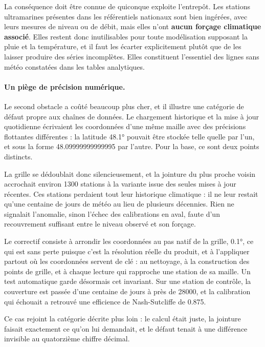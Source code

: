 La conséquence doit être connue de quiconque exploite l'entrepôt. Les stations ultramarines
présentes dans les référentiels nationaux sont bien ingérées, avec leurs mesures de niveau ou de
débit, mais elles n'ont \textbf{aucun forçage climatique associé}. Elles restent donc
inutilisables pour toute modélisation supposant la pluie et la température, et il faut les
écarter explicitement plutôt que de les laisser produire des séries incomplètes. Elles
constituent l'essentiel des lignes sans météo constatées dans les tables analytiques.

\paragraph{Un piège de précision numérique.} Le second obstacle a coûté beaucoup plus cher, et il
illustre une catégorie de défaut propre aux chaînes de données. Le chargement historique et la
mise à jour quotidienne écrivaient les coordonnées d'une même maille avec des précisions
flottantes différentes : la latitude \ang{48.1} pouvait être stockée telle quelle par l'un, et
sous la forme \num{48.09999999999995} par l'autre. Pour la base, ce sont deux points distincts.

La grille se dédoublait donc silencieusement, et la jointure du plus proche voisin accrochait
environ \num{1300} stations à la variante issue des seules mises à jour récentes. Ces stations
perdaient tout leur historique climatique : il ne leur restait qu'une centaine de jours de météo
au lieu de plusieurs décennies. Rien ne signalait l'anomalie, sinon l'échec des calibrations en
aval, faute d'un recouvrement suffisant entre le niveau observé et son forçage.

Le correctif consiste à arrondir les coordonnées au pas natif de la grille, \ang{0.1}, ce qui est
sans perte puisque c'est la résolution réelle du produit, et à l'appliquer partout où les
coordonnées servent de clé : au nettoyage, à la construction des points de grille, et à chaque
lecture qui rapproche une station de sa maille. Un test automatique garde désormais cet
invariant. Sur une station de contrôle, la couverture est passée d'une centaine de
jours à près de \num{28000}, et la calibration qui échouait a retrouvé une efficience de
Nash-Sutcliffe de \num{0,875}.

Ce cas rejoint la catégorie décrite plus loin : le calcul était juste, la jointure faisait
exactement ce qu'on lui demandait, et le défaut tenait à une différence invisible au quatorzième
chiffre décimal.


